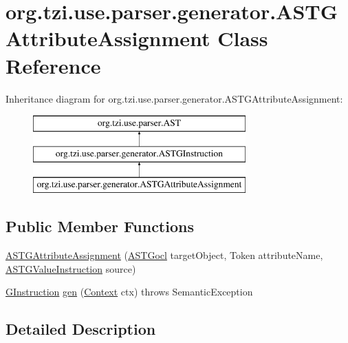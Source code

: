 \hypertarget{classorg_1_1tzi_1_1use_1_1parser_1_1generator_1_1_a_s_t_g_attribute_assignment}{\section{org.\-tzi.\-use.\-parser.\-generator.\-A\-S\-T\-G\-Attribute\-Assignment Class Reference}
\label{classorg_1_1tzi_1_1use_1_1parser_1_1generator_1_1_a_s_t_g_attribute_assignment}
}
Inheritance diagram for org.\-tzi.\-use.\-parser.\-generator.\-A\-S\-T\-G\-Attribute\-Assignment\-:\begin{figure}[H]
\begin{center}
\leavevmode
\includegraphics[height=3.000000cm]{classorg_1_1tzi_1_1use_1_1parser_1_1generator_1_1_a_s_t_g_attribute_assignment}
\end{center}
\end{figure}
\subsection*{Public Member Functions}
\begin{DoxyCompactItemize}
\item 
\hyperlink{classorg_1_1tzi_1_1use_1_1parser_1_1generator_1_1_a_s_t_g_attribute_assignment_ab913e0da625481289330f734b68a26dc}{A\-S\-T\-G\-Attribute\-Assignment} (\hyperlink{classorg_1_1tzi_1_1use_1_1parser_1_1generator_1_1_a_s_t_gocl}{A\-S\-T\-Gocl} target\-Object, Token attribute\-Name, \hyperlink{classorg_1_1tzi_1_1use_1_1parser_1_1generator_1_1_a_s_t_g_value_instruction}{A\-S\-T\-G\-Value\-Instruction} source)
\item 
\hyperlink{interfaceorg_1_1tzi_1_1use_1_1gen_1_1assl_1_1statics_1_1_g_instruction}{G\-Instruction} \hyperlink{classorg_1_1tzi_1_1use_1_1parser_1_1generator_1_1_a_s_t_g_attribute_assignment_a471445481dd4b02216c1e0ae45a0e6ad}{gen} (\hyperlink{classorg_1_1tzi_1_1use_1_1parser_1_1_context}{Context} ctx)  throws Semantic\-Exception 
\end{DoxyCompactItemize}


\subsection{Detailed Description}


